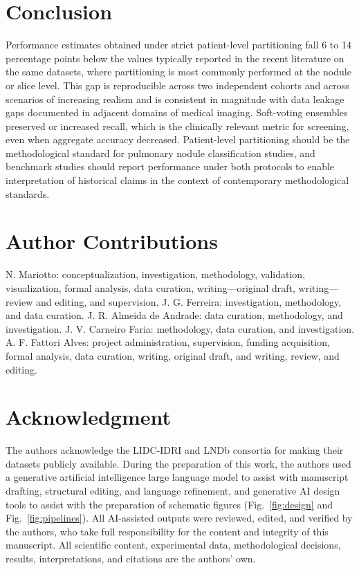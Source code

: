 \documentclass{ieeeaccess}
\begin{document}
\section{Conclusion}
\label{sec:conclusion}
Performance estimates obtained under strict patient-level partitioning fall 6 to 14 percentage points below the values typically reported in the recent literature on the same datasets, where partitioning is most commonly performed at the nodule or slice level. This gap is reproducible across two independent cohorts and across scenarios of increasing realism and is consistent in magnitude with data leakage gaps documented in adjacent domains of medical imaging. Soft-voting ensembles preserved or increased recall, which is the clinically relevant metric for screening, even when aggregate accuracy decreased. Patient-level partitioning should be the methodological standard for pulmonary nodule classification studies, and benchmark studies should report performance under both protocols to enable interpretation of historical claims in the context of contemporary methodological standards.

\section*{Author Contributions}
N. Mariotto: conceptualization, investigation, methodology, validation, visualization, formal analysis, data curation, writing---original draft, writing---review and editing, and supervision. J. G. Ferreira: investigation, methodology, and data curation. J. R. Almeida de Andrade: data curation, methodology, and investigation. J. V. Carneiro Faria: methodology, data curation, and investigation. A. F. Fattori Alves: project administration, supervision, funding acquisition, formal analysis, data curation, writing, original draft, and writing, review, and editing.

\section*{Acknowledgment}
The authors acknowledge the LIDC-IDRI and LNDb consortia for making their datasets publicly available. During the preparation of this work, the authors used a generative artificial intelligence large language model to assist with manuscript drafting, structural editing, and language refinement, and generative AI design tools to assist with the preparation of schematic figures (Fig.~\ref{fig:design} and Fig.~\ref{fig:pipelines}). All AI-assisted outputs were reviewed, edited, and verified by the authors, who take full responsibility for the content and integrity of this manuscript. All scientific content, experimental data, methodological decisions, results, interpretations, and citations are the authors' own.
\end{document}
